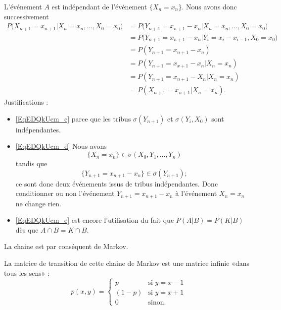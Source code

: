 L'événement \( A\) est indépendant de l'événement \( \{ X_n=x_n \}\). Nous avons donc successivement
\begin{subequations}
	\begin{align}
		P\big( X_{n+1}=x_{n+1}| X_n=x_n,\ldots,X_0=x_0 \big) & =P\big( Y_{n+1}=x_{n+1}-x_n| X_n=x_n,\ldots,X_0=x_0 \big)  \\
		                                                     & =P\big( Y_{n+1}=x_{n+1}-x_n|  Y_i=x_i-x_{i-1},X_0=x_0\big) \\
		                                                     & =P(Y_{n+1}=x_{n+1}-x_n)        \label{EqEDQkUcm_c}         \\
		                                                     & =P(Y_{n+1}=x_{x+1}-x_n|X_n=x_n)    \label{EqEDQkUcm_d}     \\
		                                                     & =P(Y_{n+1}=x_{n+1}-X_n|X_n=x_n)        \label{EqEDQkUcm_e} \\
		                                                     & =P(X_{n+1}=x_{n+1}|X_n=x_n).
	\end{align}
\end{subequations}
Justifications :
\begin{itemize}
	\item \eqref{EqEDQkUcm_c} parce que les tribus \( \sigma(Y_{n+1})\) et \( \sigma(Y_i,X_0)\) sont indépendantes.
	\item \eqref{EqEDQkUcm_d} Nous avons
	      \begin{equation}
		      \{ X_n=x_n \}\in\sigma(X_0,Y_1,\ldots, Y_n)
	      \end{equation}
	      tandis que
	      \begin{equation}
		      \{ Y_{n+1}=x_{n+1}-x_n \}\in\sigma(Y_{n+1});
	      \end{equation}
	      ce sont donc deux événements issus de tribus indépendantes. Donc conditionner ou non l'événement \( Y_{n+1}=x_{n+1}-x_n\) à l'événement \( X_n=x_n\) ne change rien.
	\item \eqref{EqEDQkUcm_e} est encore l'utilisation du fait que \( P(A|B)=P(K|B)\) dès que \( A\cap B=K\cap B\).

\end{itemize}

La chaine est par conséquent de Markov.

La matrice de transition de cette chaine de Markov est une matrice infinie «dans tous les sens» :
\begin{equation}
	p(x,y)=\begin{cases}
		p     & \text{si }y=x-1 \\
		(1-p) & \text{si }y=x+1 \\
		0     & \text{sinon}.
	\end{cases}
\end{equation}

